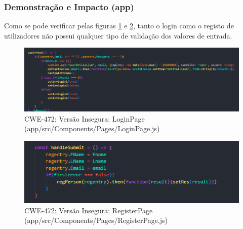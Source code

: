 \subsubsection{Demonstração e Impacto (app)}
Como se pode verificar pelas figuras \ref{fig:cwe472-unsafe-loginpage} e \ref{fig:cwe472-unsafe-registerpage}, tanto o login como o registo de utilizadores não possui qualquer tipo de validação dos valores de entrada.
\begin{figure}[H]
  \centering
  \includegraphics[width=0.9\linewidth]{images/CWE472-unsafe-LoginPage.png}
  \caption{CWE-472: Versão Insegura: LoginPage (app/src/Components/Pages/LoginPage.js)}
  \label{fig:cwe472-unsafe-loginpage}
\end{figure}
\begin{figure}[H]
  \centering
  \includegraphics[width=0.8\linewidth]{images/CWE472-unsafe-RegisterPage.png}
  \caption{CWE-472: Versão Insegura: RegisterPage (app/src/Components/Pages/RegisterPage.js)}
  \label{fig:cwe472-unsafe-registerpage}
\end{figure}

